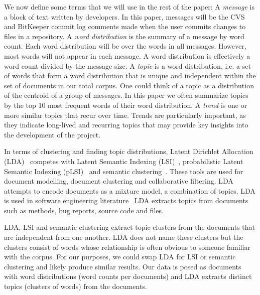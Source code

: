 \documentclass[times, 10pt,twocolumn]{article}
\newcommand{\shrinkit}{\vspace*{-.3em}}
\begin{document}
We now define some terms that we will use in the rest of the paper: A
\emph{message} is a block of text written by developers. In this
paper, messages will be the CVS and BitKeeper commit log comments made
when the user commits changes to files in a repository. A \emph{word
  distribution} is the summary of a message by word count. Each word
distribution will be over the words in all messages. However, most
words will not appear in each message. A word distribution is effectively
a word count divided by the message size. A \emph{topic} is a word
distribution, i.e. a set of words that form a word distribution that is
unique and independent within the set of documents in our total
corpus. One could think of a topic as a distribution of the centroid
of a group of messages. In this paper we often summarize topics by the
top 10 most frequent words of their word distribution.  A \emph{trend}
is one or more similar topics that recur over time.  Trends are
particularly important, as they indicate long-lived and recurring
topics that may provide key insights into the development of the
project.


In terms of clustering and finding topic distributions, Latent
Dirichlet Allocation (LDA)~\cite{944937} competes with Latent Semantic
Indexing
(LSI)~\cite{1374321,10.1109/ICPC.2007.13},
probabilistic Latent Semantic Indexing (pLSI)~\cite{944937} and
semantic clustering~\cite{1698774,1566153}. These tools are used for
document modelling, document clustering and collaborative
filtering. LDA attempts to encode documents as a mixture
model, a combination of topics.  LDA is used in software engineering
literature~\cite{lukins2008,10.1109/MSR.2007.20}%
LDA extracts topics from documents such as methods, bug
reports, source code and files.

LDA, LSI and semantic clustering extract topic
clusters from the documents that are independent from one another. LDA
does not name these clusters but the clusters consist of words whose
relationship is often obvious to someone familiar with the corpus. For our purposes, we
could swap LDA for LSI or semantic clustering and likely produce similar
results. Our data is posed as documents with word distributions (word
counts per documents) and LDA extracts distinct topics (clusters of
words) from the documents.

\shrinkit
{}
\shrinkit
\end{document}
